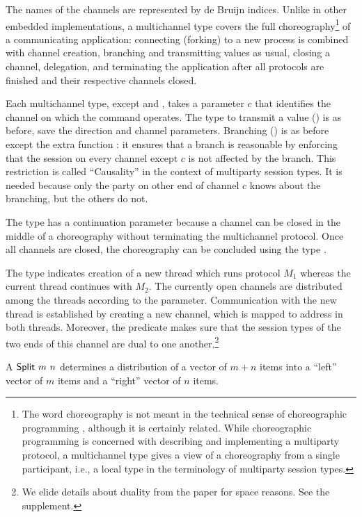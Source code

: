 \documentclass[acmsmall,screen]{acmart}
\begin{document}
The names of the channels are represented by
de Bruijn indices. Unlike in other embedded implementations, a
multichannel type covers the full choreography\footnote{The word
  choreography is not meant in the technical sense of choreographic
  programming \cite{cruz-filipe23:_formal_theor_choreog_progr},
  although it is certainly related. While choreographic programming is
concerned with describing and implementing a multiparty protocol, a
multichannel type gives a view of a choreography from a single
participant, i.e., a local type in the terminology of multiparty
session types.} of a communicating
application: connecting (forking) to a new process is combined with channel creation, branching and transmitting values as usual, closing a
channel, delegation, and terminating the application after all
protocols are finished and their respective channels closed.

\multiMSession

Each multichannel type, except {\ACconnect} and {\ACterminate}, takes a parameter
$c$ that identifies the channel on which the command operates. 
The type to transmit a value (\ACtransmit) is as before, save the
direction and channel parameters. Branching (\ACbranch) is as before
except the extra function {\ACausality}: it ensures that a branch is
reasonable by enforcing that the session on every channel except $c$
is not affected by the branch. This restriction is called
``Causality'' in the context of multiparty session types. It is needed
because only the party on other end of channel $c$ knows about the
branching, but the others do not.

The {\ACclose} type has a continuation parameter because a channel
can be closed in the middle of a choreography without terminating the
multichannel protocol. Once all channels are closed, the choreography
can be concluded using the type {\ACterminate}.

The type {\ACconnect} indicates creation of a new thread which runs protocol $M_1$
whereas the current thread continues with $M_2$. The currently open
channels are distributed among the threads according to the {\ASplit}
parameter.
Communication with the new thread is established by 
creating a new channel, which is mapped to address {\Azero} in both
threads. Moreover, the {\ACheckDual} predicate makes sure that the
session types of the two ends of this channel are dual to one another.\footnote{We elide details about
  duality from the paper for space reasons. See the supplement.}

A $\ASplit~m~n$ determines a distribution of a vector of $m+n$ items
into a ``left'' vector of $m$ items and a ``right'' vector of $n$ items.
\dataSplit
\end{document}
